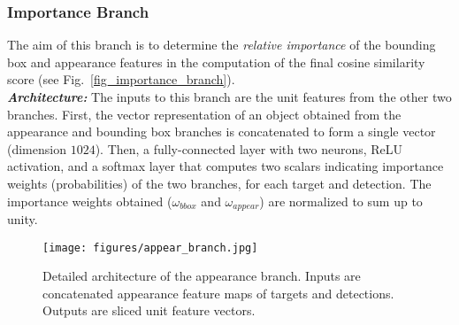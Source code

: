 \documentclass[letterpaper, 10 pt, conference]{ieeeconf}
\begin{document}
\subsubsection{Importance Branch}
The aim of this branch is to determine the \textit{relative importance} of the bounding box and appearance features in the computation of the final cosine similarity score (see Fig.~\ref{fig_importance_branch}). 
\\\textbf{\textit{Architecture:}} The inputs to this branch are the unit features from the other two branches.  First, the vector representation of an object obtained from the appearance and bounding box branches is concatenated to form a single vector (dimension $1024$). Then, a fully-connected layer with two neurons, ReLU activation, and a softmax layer that computes two scalars indicating importance weights (probabilities) of the two branches, for each target and detection. The importance weights obtained ($\omega _{bbox}$ and $\omega _{appear}$) are normalized to sum up to unity.
\begin{figure}[ht]
\vspace{1.5em}
\begin{center}
\texttt{[image: figures/appear\_branch.jpg]}
\end{center}
\caption{Detailed architecture of the appearance branch. Inputs are concatenated appearance feature maps of targets and detections. Outputs are sliced unit feature vectors.}
\label{fig_appear_branch}
\vspace{-1.5em}
\end{figure}
\end{document}

